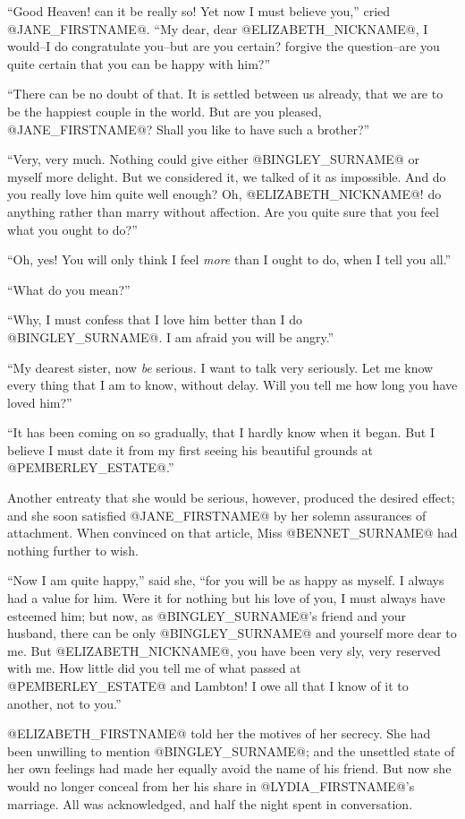 ``Good Heaven! can it be really so! Yet now I must believe you,'' cried
@JANE_FIRSTNAME@. ``My dear, dear @ELIZABETH_NICKNAME@, I would--I do congratulate you--but are you
certain? forgive the question--are you quite certain that you can be
happy with him?''

``There can be no doubt of that. It is settled between us already, that
we are to be the happiest couple in the world. But are you pleased,
@JANE_FIRSTNAME@? Shall you like to have such a brother?''

``Very, very much. Nothing could give either @BINGLEY_SURNAME@ or myself more
delight. But we considered it, we talked of it as impossible. And do you
really love him quite well enough? Oh, @ELIZABETH_NICKNAME@! do anything rather than
marry without affection. Are you quite sure that you feel what you ought
to do?''

``Oh, yes! You will only think I feel \textit{more} than I ought to do, when I
tell you all.''

``What do you mean?''

``Why, I must confess that I love him better than I do @BINGLEY_SURNAME@. I am
afraid you will be angry.''

``My dearest sister, now \textit{be} serious. I want to talk very seriously. Let
me know every thing that I am to know, without delay. Will you tell me
how long you have loved him?''

``It has been coming on so gradually, that I hardly know when it began.
But I believe I must date it from my first seeing his beautiful grounds
at @PEMBERLEY_ESTATE@.''

Another entreaty that she would be serious, however, produced the
desired effect; and she soon satisfied @JANE_FIRSTNAME@ by her solemn assurances
of attachment. When convinced on that article, Miss @BENNET_SURNAME@ had nothing
further to wish.

``Now I am quite happy,'' said she, ``for you will be as happy as myself.
I always had a value for him. Were it for nothing but his love of you,
I must always have esteemed him; but now, as @BINGLEY_SURNAME@'s friend and your
husband, there can be only @BINGLEY_SURNAME@ and yourself more dear to me. But
@ELIZABETH_NICKNAME@, you have been very sly, very reserved with me. How little did you
tell me of what passed at @PEMBERLEY_ESTATE@ and Lambton! I owe all that I know
of it to another, not to you.''

@ELIZABETH_FIRSTNAME@ told her the motives of her secrecy. She had been unwilling
to mention @BINGLEY_SURNAME@; and the unsettled state of her own feelings had made
her equally avoid the name of his friend. But now she would no longer
conceal from her his share in @LYDIA_FIRSTNAME@'s marriage. All was acknowledged,
and half the night spent in conversation.

